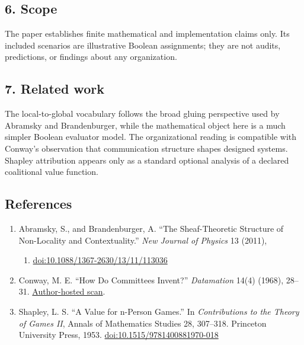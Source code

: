 \documentclass[
  11pt,
]{article}
\providecommand{\tightlist}{%
  \setlength{\itemsep}{0pt}\setlength{\parskip}{0pt}}
\theoremstyle{plain}
\theoremstyle{definition}\newtheorem{definition}[theorem]{Definition}
\theoremstyle{remark}\newtheorem*{remark}{Remark}
\begin{document}
\subsection{6. Scope}\label{scope}

The paper establishes finite mathematical and implementation claims
only. Its included scenarios are illustrative Boolean assignments; they
are not audits, predictions, or findings about any organization.

\subsection{7. Related work}\label{related-work}

The local-to-global vocabulary follows the broad gluing perspective used
by Abramsky and Brandenburger, while the mathematical object here is a
much simpler Boolean evaluator model. The organizational reading is
compatible with Conway's observation that communication structure shapes
designed systems. Shapley attribution appears only as a standard
optional analysis of a declared coalitional value function.

\subsection{References}\label{references}

\begin{enumerate}
\def\labelenumi{\arabic{enumi}.}
\tightlist
\item
  Abramsky, S., and Brandenburger, A. ``The Sheaf-Theoretic Structure of
  Non-Locality and Contextuality.'' \emph{New Journal of Physics} 13
  (2011),

  \begin{enumerate}
  \def\labelenumii{\arabic{enumii}.}
  \setcounter{enumii}{113035}
  \tightlist
  \item
    \href{https://doi.org/10.1088/1367-2630/13/11/113036}{doi:10.1088/1367-2630/13/11/113036}
  \end{enumerate}
\item
  Conway, M. E. ``How Do Committees Invent?'' \emph{Datamation} 14(4)
  (1968), 28--31.
  \href{https://melconway.com/Home/pdf/committees.pdf}{Author-hosted
  scan}.
\item
  Shapley, L. S. ``A Value for n-Person Games.'' In \emph{Contributions
  to the Theory of Games II}, Annals of Mathematics Studies 28,
  307--318. Princeton University Press, 1953.
  \href{https://doi.org/10.1515/9781400881970-018}{doi:10.1515/9781400881970-018}
\end{enumerate}
\end{document}
